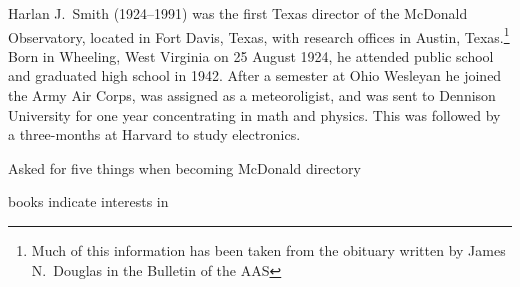

Harlan J.~Smith (1924--1991) was the first Texas director of the
McDonald Observatory, located in Fort Davis, Texas, with research
offices in Austin, Texas.\footnote{Much of this information has been
taken from the obituary written by James N.~Douglas in the Bulletin of
the AAS} Born in Wheeling, West Virginia on 25 August
1924, he attended public school and graduated high school in 1942. After
a semester at Ohio Wesleyan he joined the Army Air Corps, was assigned
as a meteoroligist, and was sent to Dennison University for one year
concentrating in math and physics. This was followed by a three-months
at Harvard to study electronics.

Asked for five things when becoming McDonald directory

books indicate interests in

